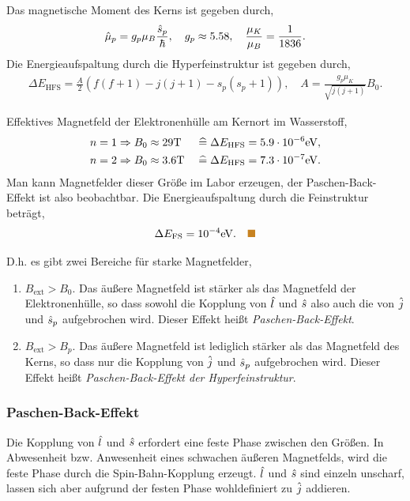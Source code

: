 Das magnetische Moment des Kerns ist gegeben durch,
\begin{align*}
\hat{\boldmath{\mu}}_p = g_p \mu_B \frac{\hat{\boldmath{s}}_p}{\hbar},\quad g_p \approx 5.58,
\quad
\frac{\mu_K}{\mu_B} = \frac{1}{1836}.
\end{align*}
Die Energieaufspaltung durch die Hyperfeinstruktur ist gegeben durch,
\begin{align*}
\Delta E_{\text{HFS}} = \frac{A}{2}\left( f(f+1)-j(j+1)-s_p(s_p+1)
\right),\quad A = \frac{g_p \mu_K}{\sqrt{j(j+1)}}B_0.
\end{align*}
\begin{bspn}
Effektives Magnetfeld der Elektronenhülle am Kernort im Wasserstoff,
\begin{align*}
&n=1 \Rightarrow B_{0} \approx 29 \mathrm{T} &&\mathrel{\widehat{=}}
\Delta E_{\text{HFS}} = 5.9\cdot 10^{-6} \mathrm{eV},\\
&n=2 \Rightarrow B_{0} \approx 3.6 \mathrm{T} &&\mathrel{\widehat{=}} \Delta E_{\text{HFS}} =
7.3 \cdot 10^{-7}\mathrm{eV}.
\end{align*}
Man kann Magnetfelder dieser Größe im Labor erzeugen, der Paschen-Back-Effekt
ist also beobachtbar.
Die Energieaufspaltung durch die Feinstruktur beträgt,
\begin{align*}
\Delta E_\text{FS} = 10^{-4}\mathrm{eV}.
\bsphere
\end{align*}
\end{bspn}
D.h. es gibt zwei Bereiche für starke Magnetfelder,
\begin{enumerate}[label=(\alph{*})]
  \item %
  $B_\text{ext}> B_0$. Das äußere Magnetfeld ist stärker als das Magnetfeld der
  Elektronenhülle, so dass sowohl die Kopplung von $\hat{\boldmath{l}}$ und $\hat{\boldmath{s}}$
  also auch die von $\hat{\boldmath{j}}$ und $\hat{\boldmath{s}}_p$ aufgebrochen
  wird. Dieser Effekt heißt \emph{Paschen-Back-Effekt}.
  \item $B_\text{ext} > B_p$. Das äußere Magnetfeld ist lediglich stärker als
  das Magnetfeld des Kerns, so dass nur die Kopplung von $\hat{\boldmath{j}}$
  und $\hat{\boldmath{s}}_p$ aufgebrochen wird. Dieser Effekt heißt
  \emph{Paschen-Back-Effekt der Hyperfeinstruktur}.
\end{enumerate}

\subsubsection{Paschen-Back-Effekt}

Die Kopplung von $\hat{\boldmath{l}}$ und $\hat{\boldmath{s}}$ erfordert eine feste Phase zwischen
den Größen. In Abwesenheit bzw. Anwesenheit eines  schwachen
äußeren Magnetfelds, wird die feste Phase durch die Spin-Bahn-Kopplung erzeugt.
$\hat{\boldmath{l}}$ und $\hat{\boldmath{s}}$ sind einzeln unscharf, lassen sich aber aufgrund der festen Phase wohldefiniert zu $\hat{\boldmath{j}}$ addieren.

